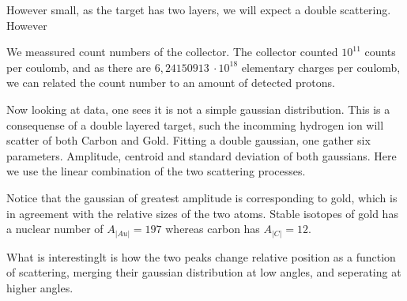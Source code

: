 However small, as the target has two layers, we will expect a double scattering. However







We meassured count numbers of the collector. The collector counted $10^{11}$
counts per coulomb, and as there are $6,24150913\ \cdot10^{18}$ elementary
charges per coulomb, we can related the count number to an amount of detected
protons.

Now looking at data, one sees it is not a simple gaussian distribution. This is
a consequense of a double layered target, such the incomming hydrogen ion will
scatter of both Carbon and Gold. Fitting a double gaussian, one gather
six parameters. Amplitude, centroid and standard deviation of both gaussians.
Here we use the linear combination of the two scattering processes. 

Notice that the gaussian of greatest amplitude is corresponding to gold, which
is in agreement with the relative sizes of the two atoms. Stable isotopes of
gold has a nuclear number of $A_|Au| = 197$ whereas carbon has $A_|C| = 12$.

What is interestinglt is how the two peaks change relative position as a
function of scattering, merging their gaussian distribution at low angles, and
seperating at higher angles. 


